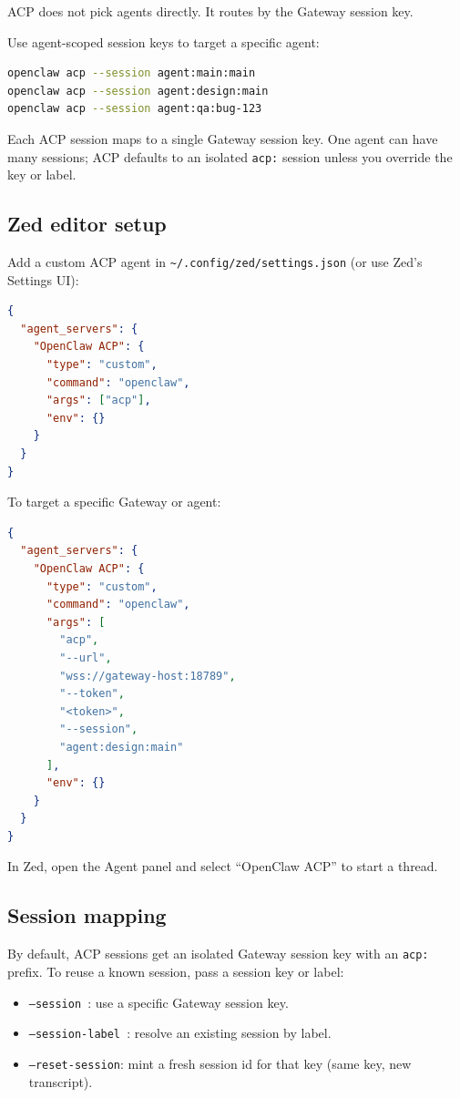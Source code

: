 ACP does not pick agents directly. It routes by the Gateway session key.

Use agent-scoped session keys to target a specific agent:

\begin{lstlisting}[language=bash]
openclaw acp --session agent:main:main
openclaw acp --session agent:design:main
openclaw acp --session agent:qa:bug-123
\end{lstlisting}


Each ACP session maps to a single Gateway session key. One agent can have many
sessions; ACP defaults to an isolated \texttt{acp:} session unless you override
the key or label.

\subsection{Zed editor setup}


Add a custom ACP agent in \texttt{\textasciitilde{}/.config/zed/settings.json} (or use Zed’s Settings UI):

\begin{lstlisting}[language=json]
{
  "agent_servers": {
    "OpenClaw ACP": {
      "type": "custom",
      "command": "openclaw",
      "args": ["acp"],
      "env": {}
    }
  }
}
\end{lstlisting}


To target a specific Gateway or agent:

\begin{lstlisting}[language=json]
{
  "agent_servers": {
    "OpenClaw ACP": {
      "type": "custom",
      "command": "openclaw",
      "args": [
        "acp",
        "--url",
        "wss://gateway-host:18789",
        "--token",
        "<token>",
        "--session",
        "agent:design:main"
      ],
      "env": {}
    }
  }
}
\end{lstlisting}


In Zed, open the Agent panel and select “OpenClaw ACP” to start a thread.

\subsection{Session mapping}


By default, ACP sessions get an isolated Gateway session key with an \texttt{acp:} prefix.
To reuse a known session, pass a session key or label:

\begin{itemize}
  \item \texttt{--session }: use a specific Gateway session key.
  \item \texttt{--session-label }: resolve an existing session by label.
  \item \texttt{--reset-session}: mint a fresh session id for that key (same key, new transcript).
\end{itemize}


